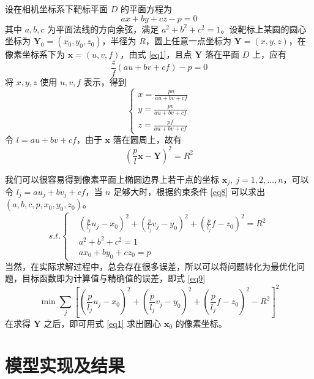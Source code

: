 \documentclass{article}
\numberwithin{equation}{section}						%
\numberwithin{figure}{section}							%
\begin{document}
\begin{sloppypar}
	设在相机坐标系下靶标平面 $D$ 的平面方程为
	\begin{equation}
		ax +by + cz -p = 0
	\end{equation}
	其中 $a, b, c$ 为平面法线的方向余弦，满足 $a^2 + b^2 + c^2 = 1$。设靶标上某圆的圆心坐标为 ${\bm Y_0} = (x_0, y_0, z_0)$，半径为 $R$，圆上任意一点坐标为 ${\bm Y} = (x, y, z)$，在像素坐标系下为 ${\bm x} = (u, v, f)$，由式 \ref{eq1}，且点 ${\bm Y}$ 落在平面 $D$ 上，应有
	\begin{equation}
		\frac{z}{f}(au + bv + cf) - p = 0
	\end{equation}
	将 $x, y, z$ 使用 $u, v, f$ 表示，得到
	\begin{equation}
		\left\lbrace
		\begin{aligned}
			x = \frac{pu}{au + bv + cf} \\
			y = \frac{pv}{au + bv + cf} \\
			z = \frac{pf}{au + bv + cf}
		\end{aligned}
		\right.
	\end{equation}
	令 $l = au + bv + cf$，由于 ${\bm x}$ 落在圆周上，故有
	\begin{equation}
		\left(\frac{p}{l}{\bm x} - {\bm Y} \right)^2 = R^2
	\end{equation}
	
	我们可以很容易得到像素平面上椭圆边界上若干点的坐标 ${\bm x_j}, \ j = 1, 2, \dots, n$，可以令 $l_j = au_j + bv_j + cf$，当 $n$ 足够大时，根据约束条件 \ref{eq8} 可以求出 $(a, b, c, p, x_0, y_0, z_0)$。
	\begin{equation}
		s.t.\left\lbrace
		\begin{aligned}
			&\left(\frac{p}{l_j}u_j - x_0 \right)^2 + \left(\frac{p}{l_j}v_j - y_0 \right)^2 + \left(\frac{p}{l_j}f - z_0 \right)^2= R^2 \\
			&a^2 + b^2 + c^2 = 1 \\
			&ax_0 + by_0 + cz_0 = p
		\end{aligned}
		\right.
		\label{eq8}
	\end{equation}
	当然，在实际求解过程中，总会存在很多误差，所以可以将问题转化为最优化问题，目标函数即为计算值与精确值的误差，即式 \ref{eq9}
	\begin{equation}
		\min\sum_{j}\left[ \left(\frac{p}{l_j}u_j - x_0 \right)^2 + \left(\frac{p}{l_j}v_j - y_0 \right)^2 + \left(\frac{p}{l_j}f - z_0 \right)^2 - R^2 \right]^2
		\label{eq9}
	\end{equation}
	在求得 $\bm Y$ 之后，即可用式 \ref{eq1} 求出圆心 ${\bm x_0}$ 的像素坐标。
	\section{模型实现及结果}


\end{sloppypar}
\end{document}
